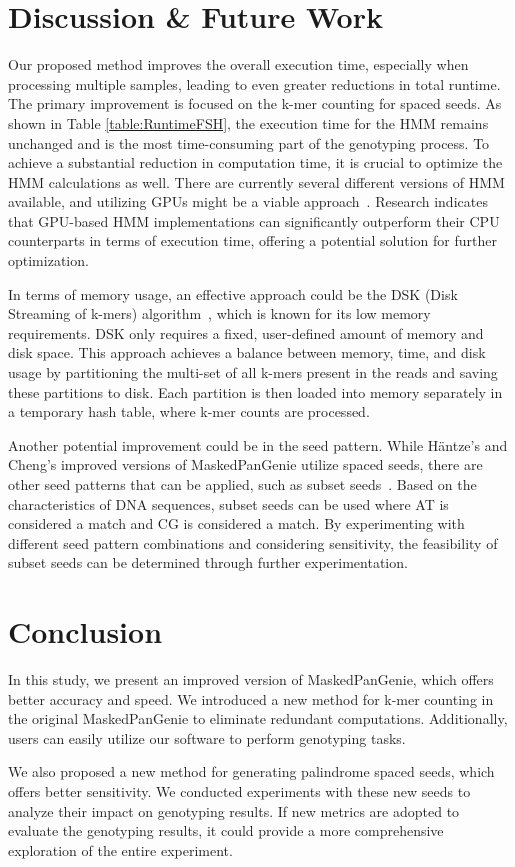 \documentclass[PhD]{PHlab-thesis}
\begin{document}
\chapter{Discussion \& Future Work}
Our proposed method improves the overall execution time, especially when processing multiple samples, leading to even greater reductions in total runtime. The primary improvement is focused on the k-mer counting for spaced seeds. As shown in Table \ref{table:RuntimeFSH}, the execution time for the HMM remains unchanged and is the most time-consuming part of the genotyping process. To achieve a substantial reduction in computation time, it is crucial to optimize the HMM calculations as well. There are currently several different versions of HMM available, and utilizing GPUs might be a viable approach~\cite{FastHMM}. Research indicates that GPU-based HMM implementations can significantly outperform their CPU counterparts in terms of execution time, offering a potential solution for further optimization.

In terms of memory usage, an effective approach could be the DSK (Disk Streaming of k-mers) algorithm~\cite{DSK}, which is known for its low memory requirements. DSK only requires a fixed, user-defined amount of memory and disk space. This approach achieves a balance between memory, time, and disk usage by partitioning the multi-set of all k-mers present in the reads and saving these partitions to disk. Each partition is then loaded into memory separately in a temporary hash table, where k-mer counts are processed.

Another potential improvement could be in the seed pattern. While Häntze's and Cheng's improved versions of MaskedPanGenie utilize spaced seeds, there are other seed patterns that can be applied, such as subset seeds~\cite{SubsetSeeds}. Based on the characteristics of DNA sequences, subset seeds can be used where AT is considered a match and CG is considered a match. By experimenting with different seed pattern combinations and considering sensitivity, the feasibility of subset seeds can be determined through further experimentation.

\chapter{Conclusion}
In this study, we present an improved version of MaskedPanGenie, which offers better accuracy and speed. We introduced a new method for k-mer counting in the original MaskedPanGenie to eliminate redundant computations. Additionally, users can easily utilize our software to perform genotyping tasks. 

We also proposed a new method for generating palindrome spaced seeds, which offers better sensitivity. We conducted experiments with these new seeds to analyze their impact on genotyping results. If new metrics are adopted to evaluate the genotyping results, it could provide a more comprehensive exploration of the entire experiment.


\newpage
{}
\printbibliography
\end{document}
